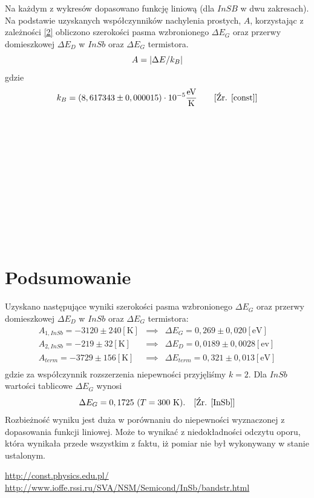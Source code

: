 \documentclass[11pt]{article}
\begin{document}
Na każdym z wykresów dopasowano funkcję liniową (dla $InSB$ w dwu zakresach). Na podstawie uzyskanych współczynników 
nachylenia prostych, $A$, korzystając z zależności \ref{2} obliczono szerokości pasma wzbronionego $\Delta E_G $ oraz przerwy
domieszkowej $\Delta E_D$ w $InSb$ oraz $\Delta E_G$ termistora.
\begin{equation}{\label{2}}
A=|\Delta E/k_B|
\end{equation}
gdzie 
$$k_B =  (8,617343 \pm 0,000015 )\cdot 10^{-5} \frac{\mbox{eV}}{\mbox{K}} \qquad [\mbox{Źr. \cite{const}}]$$ 
\\
\\
\\
\\
\\
\\
\\
\\
\\
\\
\\
\section*{Podsumowanie}
Uzyskano następujące wyniki szerokości pasma wzbronionego $\Delta E_G $ oraz przerwy
domieszkowej $\Delta E_D$ w $InSb$ oraz $\Delta E_G$ termistora:
$$
\begin{matrix}
A_{1,InSb} = -3120 \pm 240 [\mbox{K}] & \implies & \Delta E_G = 0,269 \pm 0,020 [\mbox{eV}]\\
A_{2,InSb} = -219 \pm 32 [\mbox{K}] & \implies & \Delta E_D = 0,0189 \pm 0,0028 [\mbox{ev}]\\
A_{term} = -3729\pm 156 [\mbox{K}] & \implies & \Delta E_{term} = 0,321 \pm 0,013 [\mbox{eV}]\\
\end{matrix}
$$
gdzie za współczynnik rozszerzenia niepewności przyjęliśmy $k=2$.
Dla $InSb$ wartości tablicowe $\Delta E_G$  wynosi 
$$\Delta E_G = 0,1725 \ (T=300\mbox{ K}). \quad [\mbox{Źr. \cite{InSb}}] $$
Rozbieżność wyniku jest duża w porównaniu do niepewności wyznaczonej z dopasowania funkcji liniowej. Może to wynikać z niedokładności odczytu oporu, która wynikała przede wszystkim z faktu, iż pomiar nie był wykonywany w stanie ustalonym.   

\begin{thebibliography}{99}
 \url{http://const.physics.edu.pl/}
 \url{http://www.ioffe.rssi.ru/SVA/NSM/Semicond/InSb/bandstr.html}
\end{thebibliography}
\end{document}
